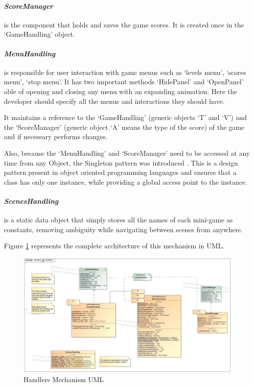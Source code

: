 \paragraph{\textit{ScoreManager}} is the component that holds and saves the game scores. It is created once in the `GameHandling' object.

\paragraph{\textit{MenuHandling}} is responsible for user interaction with game menus such as `levels menu', `scores menu', `stop menu'. It has two important methods `HidePanel' and `OpenPanel' able of opening and closing any menu with an expanding animation. Here the developer should specify all the menus and interactions they should have.

It maintains a reference to the `GameHandling' (generic objects `T' and `V') and the `ScoreManager' (generic object `A' means the type of the score) of the game and if necessary performs changes.

Also, because the `MenuHandling' and `ScoreManager' need to be accessed at any time from any Object, the Singleton pattern was introduced \cite{singleton}. This is a design pattern present in object oriented programming languages and ensures that a class has only one instance, while providing a global access point to the instance.

\paragraph{\textit{ScenesHandling}} is a static data object that simply stores all the names of each mini-game as constants, removing ambiguity while navigating between scenes from anywhere.

Figure \ref{fig:handlers} represents the complete architecture of this mechanism in UML.

\begin{figure}[H]
    \centering
    \includegraphics[width=\linewidth]{Chapters/new_architechture/class__handlers__Handlers.jpg}
    \caption{Handlers Mechanism UML}
    \label{fig:handlers}
\end{figure}

